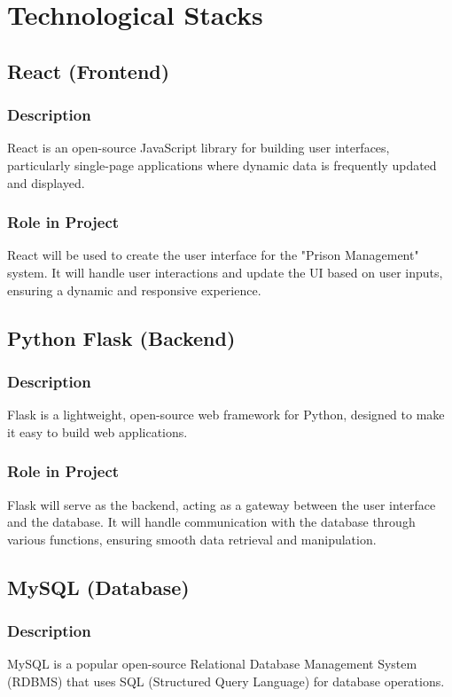 \section{Technological Stacks}

\subsection*{React (Frontend)}

\subsubsection{Description}
React is an open-source JavaScript library for building user interfaces, particularly single-page applications where dynamic data is frequently updated and displayed.

\subsubsection{Role in Project}
React will be used to create the user interface for the "Prison Management" system. It will handle user interactions and update the UI based on user inputs, ensuring a dynamic and responsive experience.

\subsection*{Python Flask (Backend)}

\subsubsection{Description}
Flask is a lightweight, open-source web framework for Python, designed to make it easy to build web applications.

\subsubsection{Role in Project}
Flask will serve as the backend, acting as a gateway between the user interface and the database. It will handle communication with the database through various functions, ensuring smooth data retrieval and manipulation.

\subsection*{MySQL (Database)}

\subsubsection{Description}
MySQL is a popular open-source Relational Database Management System (RDBMS) that uses SQL (Structured Query Language) for database operations.

